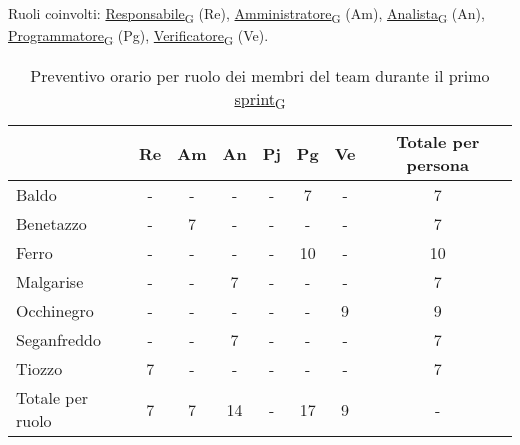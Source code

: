 \newpage
{}
Ruoli coinvolti: \href{https://7last.github.io/docs/rtb/documentazione-interna/glossario\#responsabile}{Responsabile\textsubscript{G}} (Re), \href{https://7last.github.io/docs/rtb/documentazione-interna/glossario\#amministratore}{Amministratore\textsubscript{G}} (Am), \href{https://7last.github.io/docs/rtb/documentazione-interna/glossario\#analista}{Analista\textsubscript{G}} (An), \href{https://7last.github.io/docs/rtb/documentazione-interna/glossario\#programmatore}{Programmatore\textsubscript{G}} (Pg), \href{https://7last.github.io/docs/rtb/documentazione-interna/glossario\#verificatore}{Verificatore\textsubscript{G}} (Ve).
\begin{table}[!h]
	\centering
	\begin{tabular}{ | l | c | c | c | c | c | c | c | }
		\hline
		\textbf{}        & \textbf{Re} & \textbf{Am} & \textbf{An} & \textbf{Pj} & \textbf{Pg} & \textbf{Ve} & \textbf{Totale per persona} \\
		\hline
		Baldo            & -           & -           & -           & -           & 7           & -           & 7                           \\
		Benetazzo        & -           & 7           & -           & -           & -           & -           & 7                           \\
		Ferro            & -           & -           & -           & -           & 10          & -           & 10                          \\
		Malgarise        & -           & -           & 7           & -           & -           & -           & 7                           \\
		Occhinegro       & -           & -           & -           & -           & -           & 9           & 9                           \\
		Seganfreddo      & -           & -           & 7           & -           & -           & -           & 7                           \\
		Tiozzo           & 7           & -           & -           & -           & -           & -           & 7                           \\
		\hline
		Totale per ruolo & 7           & 7           & 14          & -           & 17          & 9           & -                           \\
		\hline
	\end{tabular}
	\caption{Preventivo orario per ruolo dei membri del team durante il primo \href{https://7last.github.io/docs/rtb/documentazione-interna/glossario\#sprint}{sprint\textsubscript{G}}}
	
\end{table}

